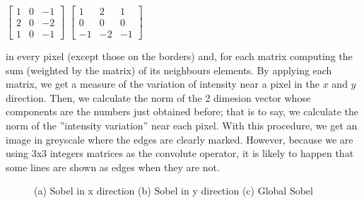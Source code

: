 \documentclass{article}
\begin{document}
\begin{enumerate}[label=5.\arabic*,leftmargin=*]
\begin{center}
$\begin{bmatrix}
    1 & 0 & -1\\
    2 & 0 & -2\\
    1 & 0 & -1
\end{bmatrix}$ \qquad $\begin{bmatrix}
        1 & 2 & 1\\
        0 & 0 & 0\\
       -1 & -2 & -1
\end{bmatrix}$
\end{center}
in every pixel (except those on the borders) and, for each matrix computing the sum (weighted by the matrix) of its neighbours elements. By applying each matrix, we get a measure of the variation of intensity near a pixel in the $x$ and $y$ direction. Then, we calculate the norm of the 2 dimesion vector whose components are the numbers just obtained before; that is to say, we calculate the norm of the ''intensity variation'' near each pixel. With this procedure, we get an image in greyscale where the edges are clearly marked. However, because we are using 3x3 integers matrices as the convolute operator, it is likely to happen that some lines are shown as edges when they are not. 


\begin{figure}[h!]
    \centering
    \caption{(a) Sobel in x direction (b) Sobel in y direction (c) Global Sobel}
    \label{sobel}
\end{figure}



\end{enumerate}
\end{document}
